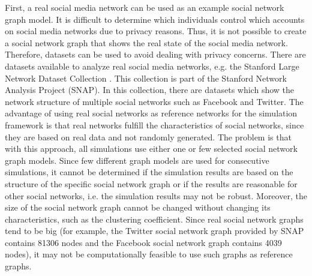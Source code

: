 First, a real social media network can be used as an example 
social network graph model. 
It is difficult to determine which individuals
control which accounts on social media networks due to privacy reasons.
Thus, it is not possible to create a social network graph that 
shows the real state of the social media network.
Therefore, datasets can be used to avoid dealing with privacy concerns. 
There are datasets available to analyze
real social media networks, e.g. the Stanford 
Large Network Dataset Collection \cite{snapnets}.
This collection is part of the Stanford Network Analysis Project (SNAP).
In this collection, there are datasets which show the network structure
of multiple social networks such as Facebook and Twitter.
The advantage of using real social networks as reference networks
for the simulation framework is that real networks fulfill the 
characteristics of social networks, since they
are based on real data and not randomly generated. The problem
is that with this approach, all simulations use either
one or few selected social network graph models. Since 
few different graph models are used for consecutive simulations,
it cannot be determined if the simulation results are based on the 
structure of the specific social network graph or if the results 
are reasonable for other social networks, i.e. the simulation results
may not be robust. Moreover, the size of the social network graph 
cannot be changed without changing its characteristics, such as 
the clustering coefficient. Since real social network graphs tend to be 
big (for example, the Twitter social network graph provided by SNAP
contains 81306 nodes and the Facebook social network graph contains 
4039 nodes), it may not be computationally feasible to use such graphs
as reference graphs.

